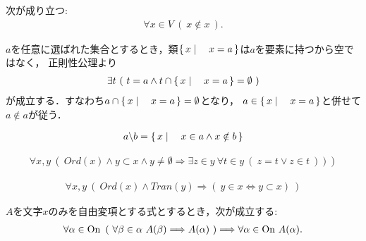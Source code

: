 	\begin{screen}
		\begin{thm}[いかなる集合も自分自身を要素に持たない]
			次が成り立つ:
			\begin{align}
				\forall x \in V\ (\ x \notin x\ ).
			\end{align}
		\end{thm}
	\end{screen}
	
	\begin{prf}
		$a$を任意に選ばれた集合とするとき，類$\left\{\, x \mid \quad x=a\, \right\}$は$a$を要素に持つから空ではなく，
		正則性公理より
		\begin{align}
			\exists t\ (\ t = a \wedge t \cap \Set{x}{x=a} = \emptyset\ )
		\end{align}
		が成立する．すなわち$a \cap \left\{\, x \mid \quad x=a\, \right\} = \emptyset$となり，
		$a \in \left\{\, x \mid \quad x=a\, \right\}$と併せて$a \notin a$が従う．
		\QED
	\end{prf}
	\begin{screen}
		\begin{dfn}[差集合]
			\begin{align}
				a \backslash b = \left\{\, x \mid \quad x \in a \wedge x \notin b\, \right\}
			\end{align}
		\end{dfn}
	\end{screen}
	
	\begin{screen}
		\begin{thm}[順序数は整列集合]
			\begin{align}
				\forall x,y\ \left(\ Ord(x) \wedge y \subset x \wedge y \neq \emptyset \Longrightarrow 
				\exists z \in y\ \forall t \in y\ (\ z=t \vee z \in t\ )\ )\ \right)
			\end{align}
		\end{thm}
	\end{screen}
	
	\begin{screen}
		\begin{thm}
			\begin{align}
				\forall x,y\ \left(\ Ord(x) \wedge Tran(y) \Longrightarrow 
				(\ y \in x \Longleftrightarrow y \subset x)\ \right)
			\end{align}
		\end{thm}
	\end{screen}
	
	\begin{screen}
		\begin{thm}[超限帰納法]
			$A$を文字$x$のみを自由変項とする式とするとき，次が成立する:
			\begin{align}
				\forall \alpha \in \ON\ 
				\left(\ \forall \beta \in \alpha\ A(\beta)
				\Longrightarrow A(\alpha)\ \right)
				\Longrightarrow \forall \alpha \in \ON\ A(\alpha).
			\end{align}
		\end{thm}
	\end{screen}
	
